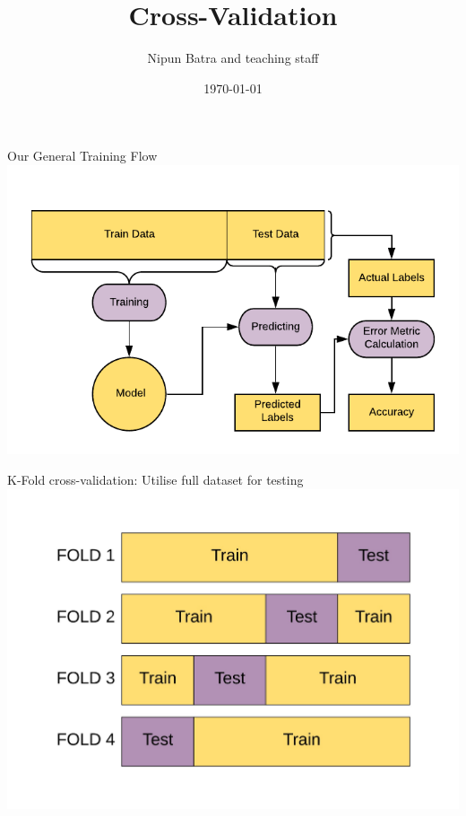 \documentclass[usenames,dvipsnames]{beamer}
\title{Cross-Validation}
\date{\today}
\author{Nipun Batra and teaching staff}
\institute{IIT Gandhinagar}
\begin{document}
	\maketitle
	
	


\begin{frame}{Our General Training Flow}
\includegraphics[width = \textwidth]{../diagrams/cross-validation/general-workflow}
\end{frame}

\begin{frame}{K-Fold cross-validation: Utilise full dataset for testing}
\includegraphics[width = \textwidth]{../diagrams/cross-validation/cross-validation-train-test}
\end{frame}
\end{document}
